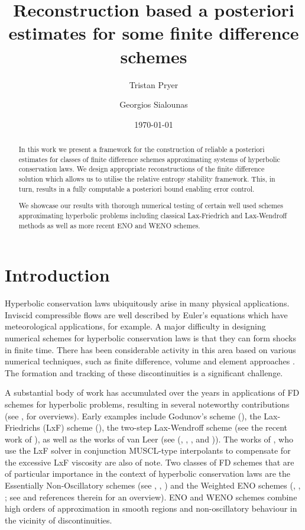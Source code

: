 \documentclass[final]{amsart}
\author{
  Tristan Pryer
}
\author{
  Georgios Sialounas
}
\title{Reconstruction based a posteriori estimates for some finite difference schemes}
\date{\today}
\numberwithin{equation}{section}
\begin{document}
\maketitle
\begin{abstract}
  In this work we present a framework for the construction of reliable
  a posteriori estimates for classes of finite difference schemes
  approximating systems of hyperbolic conservation laws. We design
  appropriate reconstructions of the finite difference solution which
  allows us to utilise the relative entropy stability framework. This,
  in turn, results in a fully computable a posteriori bound enabling
  error control.

  We showcase our results with thorough numerical testing of certain
  well used schemes approximating hyperbolic problems including
  classical Lax-Friedrich and Lax-Wendroff methods as well as more
  recent ENO and WENO schemes.
\end{abstract}

\section{Introduction}
\label{sec:introduction}

Hyperbolic conservation laws ubiquitously arise in many physical
applications. Inviscid compressible flows are well described by
Euler's equations which have meteorological applications, for
example. A major difficulty in designing numerical schemes for
hyperbolic conservation laws is that they can form shocks in finite
time. There has been considerable activity in this area based on
various numerical techniques, such as finite difference, volume and
element approaches
\cite{cockburn1995convergence,kroner1994convergence,leveque2002finite}. The
formation and tracking of these discontinuities is a significant
challenge.

A substantial body of work has accumulated over the years in
applications of FD schemes for hyperbolic problems, resulting in
several noteworthy contributions (see \cite{leveque1992numerical},
\cite{johnson1997advanced} for overviews).  Early examples include
Godunov's scheme (\cite{godunov1959difference}), the Lax-Friedrichs
(LxF) scheme (\cite{lax1954weak}), the two-step Lax-Wendroff scheme
(see the recent work of \cite{liska2021lax}), as well as the works of
van Leer (see (\cite{van1973towards}, \cite{van1974towards},
\cite{van1977towards}, \cite{van1977towardsIV} and
\cite{van1979towards})).  The works of \cite{nessyahu1990non}, who use
the LxF solver in conjunction MUSCL-type interpolants to compensate
for the excessive LxF viscosity are also of note.  Two classes of FD
schemes that are of particular importance in the context of hyperbolic
conservation laws are the Essentially Non-Oscillatory schemes (see
\cite{harten1987uniformly}, \cite{shu1988efficient},
\cite{shu1989efficient}) and the Weighted ENO schemes
(\cite{liu1994weighted}, \cite{jiang1996efficient},
\cite{jiang1998nonoscillatory}; see \cite{shu1998essentially} and
references therein for an overview).  ENO and WENO schemes combine
high orders of approximation in smooth regions and non-oscillatory
behaviour in the vicinity of discontinuities.
\end{document}
